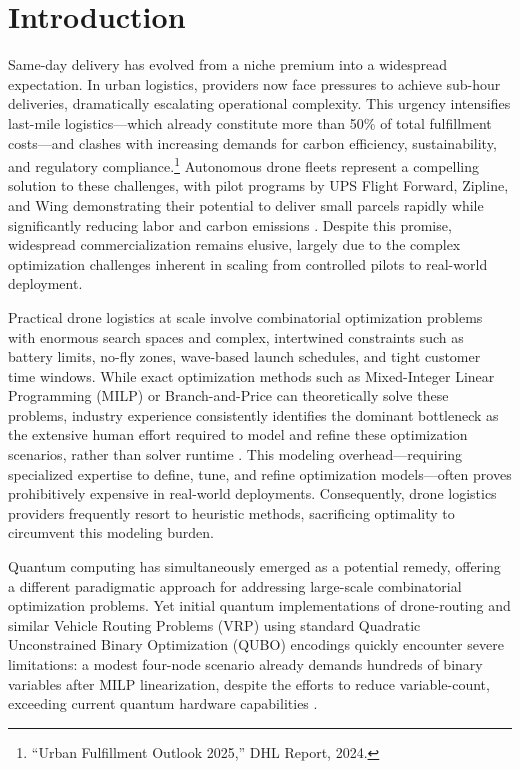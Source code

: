 \section{Introduction}

Same-day delivery has evolved from a niche premium into a widespread expectation.
In urban logistics, providers now face pressures to achieve sub-hour deliveries,
dramatically escalating operational complexity.
This urgency intensifies last-mile logistics—which already constitute more than 50\%
of total fulfillment costs—and clashes with increasing demands for carbon efficiency,
sustainability, and regulatory compliance.\footnote{``Urban Fulfillment Outlook 2025,'' DHL Report, 2024.}
Autonomous drone fleets represent a compelling solution to these challenges,
with pilot programs by UPS Flight Forward, Zipline, and Wing demonstrating their
potential to deliver small parcels rapidly while significantly reducing labor and
carbon emissions \cite{murray_multiple_2020}.
Despite this promise, widespread commercialization remains elusive, largely due to
the complex optimization challenges inherent in scaling from controlled pilots to
real-world deployment.

Practical drone logistics at scale involve combinatorial optimization problems with enormous
search spaces and complex, intertwined constraints such as battery limits, no-fly zones,
wave-based launch schedules, and tight customer time windows.
While exact optimization methods such as Mixed-Integer Linear Programming (MILP) or Branch-and-Price
can theoretically solve these problems, industry experience consistently identifies the dominant bottleneck
as the extensive human effort required to model and refine these optimization scenarios,
rather than solver runtime \cite{hildebrandt_implementation_1981,boschetti_contemporary_2024,kallrath_mixed_2000}.
This modeling overhead—requiring specialized expertise to define, tune, and refine optimization
models—often proves prohibitively expensive in real-world deployments.
Consequently, drone logistics providers frequently resort to heuristic methods,
sacrificing optimality to circumvent this modeling burden.

Quantum computing has simultaneously emerged as a potential remedy,
offering a different paradigmatic approach for addressing large-scale combinatorial optimization problems.
Yet initial quantum implementations of drone-routing and similar Vehicle Routing Problems (VRP)
using standard Quadratic Unconstrained Binary Optimization (QUBO) encodings quickly encounter severe limitations:
a modest four-node scenario already demands hundreds of binary variables after MILP linearization, despite the efforts to reduce variable-count,
exceeding current quantum hardware capabilities \cite{davies_quantum_2024}. 

